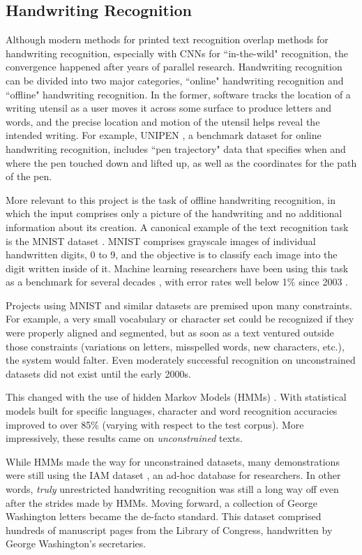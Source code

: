 \documentclass[final]{ukthesis}
\begin{document}
\subsection{Handwriting Recognition}
Although modern methods for printed text recognition overlap methods for handwriting recognition, especially with CNNs for ``in-the-wild" recognition, the convergence happened after years of parallel research. Handwriting recognition can be divided into two major categories, ``online" handwriting recognition and ``offline" handwriting recognition. In the former, software tracks the location of a writing utensil as a user moves it across some surface to produce letters and words, and the precise location and motion of the utensil helps reveal the intended writing. For example, UNIPEN \cite{guyon1994unipen}, a benchmark dataset for online handwriting recognition, includes ``pen trajectory" data that specifies when and where the pen touched down and lifted up, as well as the coordinates for the path of the pen.

More relevant to this project is the task of offline handwriting recognition, in which the input comprises only a picture of the handwriting and no additional information about its creation. A canonical example of the text recognition task is the MNIST dataset \cite{lecun1998mnist}. MNIST comprises grayscale images of individual handwritten digits, 0 to 9, and the objective is to classify each image into the digit written inside of it. Machine learning researchers have been using this task as a benchmark for several decades \cite{bottou1994comparison}, with error rates well below 1\% since 2003 \cite{kussul2004improved}.

Projects using MNIST and similar datasets are premised upon many constraints. For example, a very small vocabulary or character set could be recognized if they were properly aligned and segmented, but as soon as a text ventured outside those constraints (variations on letters, misspelled words, new characters, etc.), the system would falter. Even moderately successful recognition on unconstrained datasets did not exist until the early 2000s.

This changed with the use of hidden Markov Models (HMMs) \cite{marti2001using,bunke2004offline,el1999hmm}. With statistical models built for specific languages, character and word recognition accuracies improved to over 85\% (varying with respect to the test corpus). More impressively, these results came on { \em unconstrained} texts.

While HMMs made the way for unconstrained datasets, many demonstrations were still using the IAM dataset \cite{marti2002iam}, an ad-hoc database for researchers. In other words, {\em truly} unrestricted handwriting recognition was still a long way off even after the strides made by HMMs. Moving forward, a collection of George Washington letters became the de-facto standard. This dataset comprised hundreds of manuscript pages from the Library of Congress, handwritten by George Washington's secretaries.
\end{document}
